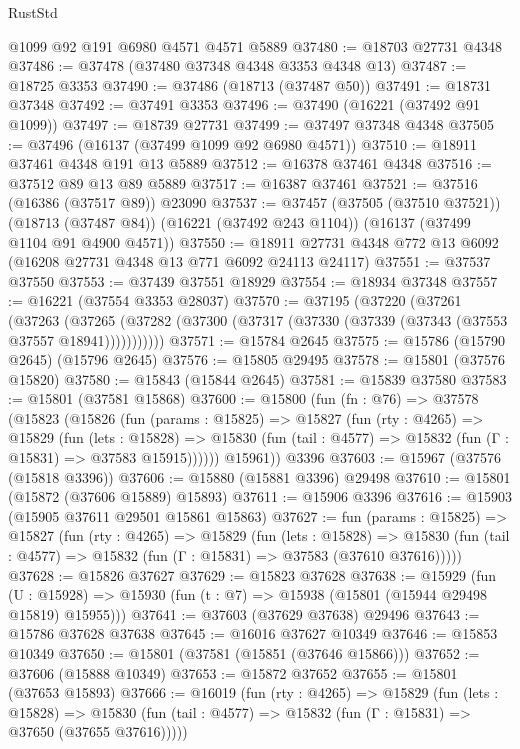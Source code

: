 \begin{lexlean}{RustStd}
\begin{coremodule}
    @1099
    @92
    @191
    @6980
    @4571
    @4571
    @5889
@37480 := @18703 @27731 @4348
@37486 := @37478 (@37480 @37348 @4348 @3353 @4348 @13)
@37487 := @18725 @3353
@37490 := @37486 (@18713 (@37487 @50))
@37491 := @18731 @37348
@37492 := @37491 @3353
@37496 := @37490 (@16221 (@37492 @91 @1099))
@37497 := @18739 @27731
@37499 := @37497 @37348 @4348
@37505 := @37496 (@16137 (@37499 @1099 @92 @6980 @4571))
@37510 := @18911 @37461 @4348 @191 @13 @5889
@37512 := @16378 @37461 @4348
@37516 := @37512 @89 @13 @89 @5889
@37517 := @16387 @37461
@37521 := @37516 (@16386 (@37517 @89)) @23090
@37537 := @37457
    (@37505 (@37510 @37521))
    (@18713 (@37487 @84))
    (@16221 (@37492 @243 @1104))
    (@16137 (@37499 @1104 @91 @4900 @4571))
@37550 := @18911 @27731 @4348 @772 @13 @6092 (@16208 @27731 @4348 @13 @771 @6092 @24113 @24117)
@37551 := @37537 @37550
@37553 := @37439 @37551 @18929
@37554 := @18934 @37348
@37557 := @16221 (@37554 @3353 @28037)
@37570 := @37195
    (@37220
      (@37261
        (@37263
          (@37265 (@37282 (@37300 (@37317 (@37330 (@37339 (@37343 (@37553 @37557 @18941)))))))))))
@37571 := @15784 @2645
@37575 := @15786 (@15790 @2645) (@15796 @2645)
@37576 := @15805 @29495
@37578 := @15801 (@37576 @15820)
@37580 := @15843 (@15844 @2645)
@37581 := @15839 @37580
@37583 := @15801 (@37581 @15868)
@37600 := @15800
    (fun (fn : @76) =>
    @37578
      (@15823
        (@15826
          (fun (params : @15825) =>
          @15827
            (fun (rty : @4265) =>
            @15829
              (fun (lets : @15828) =>
              @15830 (fun (tail : @4577) => @15832 (fun (Γ : @15831) => @37583 @15915))))))
        @15961))
    @3396
@37603 := @15967 (@37576 (@15818 @3396))
@37606 := @15880 (@15881 @3396) @29498
@37610 := @15801 (@15872 (@37606 @15889) @15893)
@37611 := @15906 @3396
@37616 := @15903 (@15905 @37611 @29501 @15861 @15863)
@37627 := fun (params : @15825) =>
  @15827
    (fun (rty : @4265) =>
    @15829
      (fun (lets : @15828) =>
      @15830 (fun (tail : @4577) => @15832 (fun (Γ : @15831) => @37583 (@37610 @37616)))))
@37628 := @15826 @37627
@37629 := @15823 @37628
@37638 := @15929
    (fun (U : @15928) => @15930 (fun (t : @7) => @15938 (@15801 (@15944 @29498 @15819) @15955)))
@37641 := @37603 (@37629 @37638) @29496
@37643 := @15786 @37628 @37638
@37645 := @16016 @37627 @10349
@37646 := @15853 @10349
@37650 := @15801 (@37581 (@15851 (@37646 @15866)))
@37652 := @37606 (@15888 @10349)
@37653 := @15872 @37652
@37655 := @15801 (@37653 @15893)
@37666 := @16019
    (fun (rty : @4265) =>
    @15829
      (fun (lets : @15828) =>
      @15830 (fun (tail : @4577) => @15832 (fun (Γ : @15831) => @37650 (@37655 @37616)))))

\end{coremodule}
\end{lexlean}
